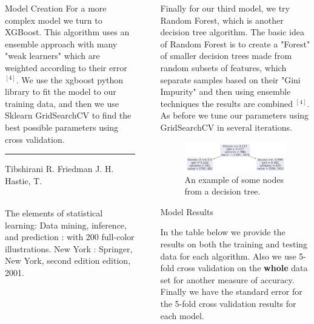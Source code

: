 \documentclass[6pt, final, xcolor=table]{beamer}
\newlength{\sepwidth}
\newlength{\colwidth}
\newcommand{\separatorcolumn}{\begin{column}{\sepwidth}\end{column}}
\begin{document}
\begin{frame}[t]
\begin{columns}[t]
\begin{column}{\colwidth}
\begin{block}{Model Creation}
    For a more complex model we turn to XGBoost.
    This algorithm uses an ensemble approach with many "weak learners" which are weighted according to their
    error $^{[4]}$. We use the xgboost python library to fit the model to our training data,
    and then we use Sklearn GridSearchCV to find the best possible parameters using
    cross validation.  

\end{block}

\hrule
\begin{description}
    \small{\item [{[4]}] Tibshirani R. Friedman J. H. Hastie, T.} \\
    \footnotesize{The elements of statistical learning: Data mining, inference, and prediction : with 200 full-color illustrations. New York : Springer, New York, second edition edition, 2001.} 
\end{description}

\end{column}

\separatorcolumn

\begin{column}{\colwidth}

    Finally for our third model, we try Random Forest, which is another decision tree
    algorithm. The basic idea of Random Forest is to create a "Forest" of smaller decision trees made from random subsets of features, which separate samples based on their "Gini Impurity" and then using ensemble techniques the results are combined $^{[4]}$. As before we tune our parameters using GridSearchCV in several iterations.
  \begin{figure}[h!]
    \centering
     \includegraphics[scale=1.3]{smaller_rf_tree.png}
    \caption{An example of some nodes from a decision tree.}
    \label{fig:method}
    \end{figure}  


  \begin{block}{Model Results}

    In the table below we provide the results on both the training and testing data for each
    algorithm. Also we use 5-fold cross validation on the \textbf{whole} data set for another
    measure of accuracy. Finally we have the standard error for the 5-fold cross validation
    results for each model.


\end{block}
\end{column}
\end{columns}
\end{frame}
\end{document}
